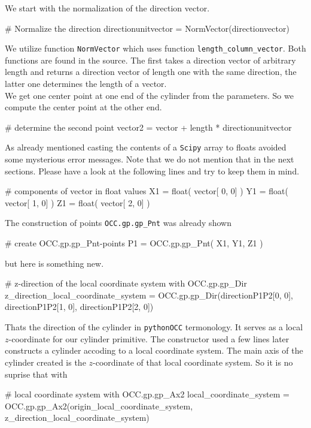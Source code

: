 We start with the normalization of the direction vector.
\begin{python}
    # Normalize the direction
    directionunitvector = NormVector(directionvector)
\end{python}
We utilize function {\tt NormVector} which uses function {\tt length\_column\_vector}.
Both functions are found in the source.
The first takes a direction vector of arbitrary length and returns a direction vector of length one with the same direction, the latter one determines the length of a vector.
\\
We get one center point at one end of the cylinder from the parameters.
So we compute the center point at the other end.
\begin{python}
    # determine the second point
    vector2 = vector + length * directionunitvector    
\end{python}
As already mentioned casting the contents of a {\tt Scipy} array to floats avoided some mysterious error messages.
Note that we do not mention that in the next sections. 
Please have a look at the following lines and try to keep them in mind.
\begin{python}
    # components of vector in float values
    X1 = float( vector[ 0, 0] )
    Y1 = float( vector[ 1, 0] )
    Z1 = float( vector[ 2, 0] )
\end{python}
The construction of points {\tt OCC.gp.gp\_Pnt} was already shown
\begin{python}
    # create OCC.gp.gp_Pnt-points
    P1 = OCC.gp.gp_Pnt( X1, Y1, Z1 )
\end{python}
but here is something new.
\begin{python}
    # z-direction of the local coordinate system with OCC.gp.gp_Dir
    z_direction_local_coordinate_system = OCC.gp.gp_Dir(directionP1P2[0, 0], 
                                                        directionP1P2[1, 0], 
                                                        directionP1P2[2, 0])
\end{python}
Thats the direction of the cylinder in {\tt pythonOCC} termonology.
It serves as a local $z$-coordinate for our cylinder primitive.
The constructor used a few lines later constructs a cylinder accoding to a local coordinate system.
The main axis of the cylinder created is the $z$-coordinate of that local coordinate system.
So it is no suprise that with
\begin{python}
    # local coordinate system with OCC.gp.gp_Ax2
    local_coordinate_system = OCC.gp.gp_Ax2(origin_local_coordinate_system, 
                                            z_direction_local_coordinate_system)
\end{python}
